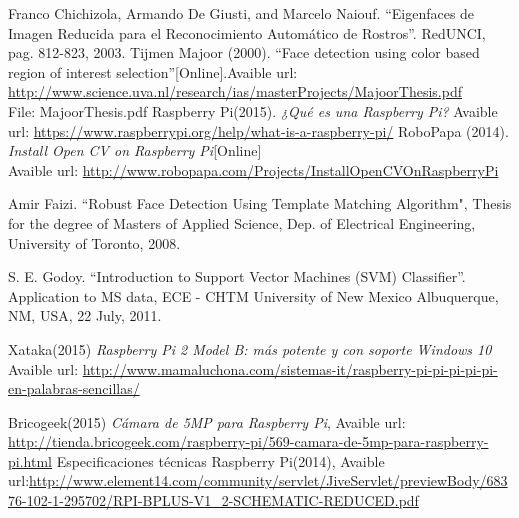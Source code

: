 \documentclass[letterpaper,12pt]{article}
\begin{document}
\begin{thebibliography}{}
  Franco Chichizola, Armando De Giusti, and Marcelo Naiouf. ``Eigenfaces de Imagen Reducida para el Reconocimiento Automático de Rostros''. RedUNCI, pag. 812-823, 2003.
 Tijmen Majoor (2000). ``Face detection using color based region of interest selection''[Online].Avaible url:\\
 \url{http://www.science.uva.nl/research/ias/masterProjects/MajoorThesis.pdf} \\
 File: MajoorThesis.pdf
 Raspberry Pi(2015). \textit{¿Qué es una Raspberry Pi?} Avaible url:   \url{https://www.raspberrypi.org/help/what-is-a-raspberry-pi/}
 RoboPapa (2014). \textit{Install Open CV on Raspberry Pi}[Online]\\
Avaible url: \url{http://www.robopapa.com/Projects/InstallOpenCVOnRaspberryPi}

 Amir Faizi. ``Robust Face Detection Using Template Matching Algorithm", Thesis for the degree of Masters of Applied Science, Dep. of Electrical Engineering, University of Toronto, 2008.

 S. E. Godoy. ``Introduction to Support Vector Machines (SVM) Classifier''. Application to MS data, ECE - CHTM
University of New Mexico Albuquerque, NM, USA, 22 July, 2011.

 Xataka(2015) \textit{Raspberry Pi 2 Model B: más potente y con soporte Windows 10} Avaible url: \url{http://www.mamaluchona.com/sistemas-it/raspberry-pi-pi-pi-pi-pi-en-palabras-sencillas/}

 Bricogeek(2015) \textit{Cámara de 5MP para Raspberry Pi}, Avaible url: \url{http://tienda.bricogeek.com/raspberry-pi/569-camara-de-5mp-para-raspberry-pi.html}
 Especificaciones técnicas Raspberry Pi(2014), Avaible url:\url{http://www.element14.com/community/servlet/JiveServlet/previewBody/68376-102-1-295702/RPI-BPLUS-V1_2-SCHEMATIC-REDUCED.pdf}




\end{thebibliography}
\end{document}
